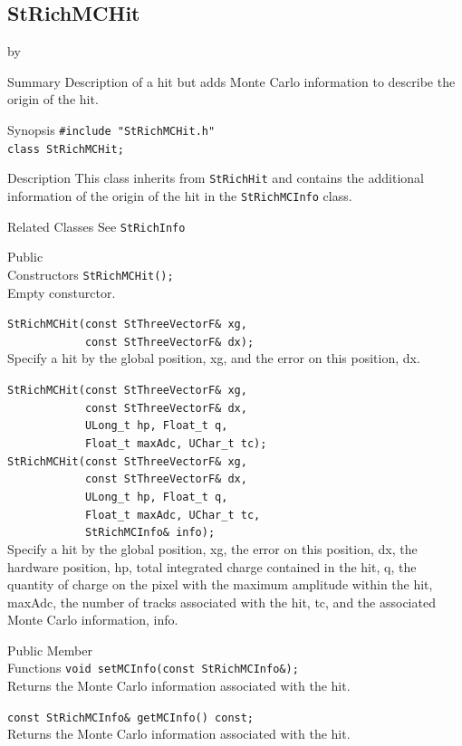 \documentclass[twoside]{article}
\newcommand{\entrylabel}[1]{\mbox{\textbf{{#1}}}\hfil}%
\newenvironment{entry}
{\begin{list}{}%
    {\renewcommand{\makelabel}{\entrylabel}%
     \setlength{\labelwidth}{90pt}%
     \setlength{\leftmargin}{\labelwidth}
     \advance\leftmargin by \labelsep%
      }%
    }%
  {\end{list}}
\newcommand{\Entrylabel}[1]%
{\raisebox{0pt}[1ex][0pt]{\makebox[\labelwidth][l]%
    {\parbox[t]{\labelwidth}{\hspace{0pt}\textbf{{#1}}}}}}
\newenvironment{Entry}%
{\renewcommand{\entrylabel}{\Entrylabel}\begin{entry}}%
  {\end{entry}}
\begin{document}
\subsection{StRichMCHit}
\label{sec:StRichMCHit}
\begin{Entry}
\item[Summary] Description of a hit but adds Monte Carlo
    information to describe the origin of the hit.
\item[Synopsis]
    \verb+#include "StRichMCHit.h"+\\
    \verb+class StRichMCHit;+\\
\item[Description] This class inherits from \texttt{StRichHit}
    and contains the additional information of the
    origin of the hit in the \texttt{StRichMCInfo} class.
\item[Related Classes]
    See \texttt{StRichInfo}
\item[Public\\ Constructors]
    \verb+StRichMCHit();+\\
    Empty consturctor.
    
    \verb+StRichMCHit(const StThreeVectorF& xg,+\\
    \verb+            const StThreeVectorF& dx);+\\
    Specify a hit by the global position, xg, and the error on this
    position, dx.

    \verb+StRichMCHit(const StThreeVectorF& xg,+\\
    \verb+            const StThreeVectorF& dx,+\\
    \verb+            ULong_t hp, Float_t q,+\\
    \verb+            Float_t maxAdc, UChar_t tc);+\\

    \verb+StRichMCHit(const StThreeVectorF& xg,+\\
    \verb+            const StThreeVectorF& dx,+\\
    \verb+            ULong_t hp, Float_t q,+\\
    \verb+            Float_t maxAdc, UChar_t tc,+\\
    \verb+            StRichMCInfo& info);+\\
    Specify a hit by the global position, xg, the error on this
    position, dx, the hardware position, hp, total integrated charge
    contained in the hit, q, the quantity of charge on the pixel with
    the maximum amplitude within the hit, maxAdc, the number of
    tracks associated with the hit, tc, and the associated Monte Carlo
    information, info.
\item[Public Member\\ Functions]
    \verb+void setMCInfo(const StRichMCInfo&);+\\
    Returns the Monte Carlo information associated with the hit.

    \verb+const StRichMCInfo& getMCInfo() const;+\\
    Returns the Monte Carlo information associated with the hit.
\end{Entry}
\clearpage
\end{document}
